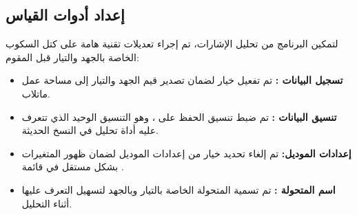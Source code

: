 
\subsection{إعداد أدوات القياس}
لتمكين البرنامج من تحليل الإشارات، تم إجراء تعديلات تقنية هامة على كتل السكوب  الخاصة بالجهد والتيار قبل المقوم:
\begin{itemize}
    \item \textbf{تسجيل البيانات :} تم تفعيل خيار  لضمان تصدير قيم الجهد والتيار إلى مساحة عمل ماتلاب.
    \item \textbf{تنسيق البيانات :} تم ضبط تنسيق الحفظ على ، وهو التنسيق الوحيد الذي تتعرف عليه أداة تحليل  في النسخ الحديثة.
    \item \textbf{إعدادات الموديل:} تم إلغاء تحديد خيار  من إعدادات الموديل  لضمان ظهور المتغيرات بشكل مستقل في قائمة .
    \item \textbf{اسم المتحولة :} تم تسمية المتحولة الخاصة بالتيار  وبالجهد  لتسهيل التعرف عليها أثناء التحليل.
\end{itemize}

